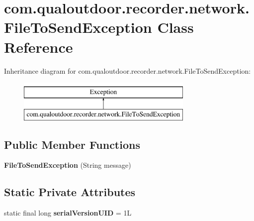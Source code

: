 \hypertarget{classcom_1_1qualoutdoor_1_1recorder_1_1network_1_1FileToSendException}{\section{com.\-qualoutdoor.\-recorder.\-network.\-File\-To\-Send\-Exception Class Reference}
\label{classcom_1_1qualoutdoor_1_1recorder_1_1network_1_1FileToSendException}
}
Inheritance diagram for com.\-qualoutdoor.\-recorder.\-network.\-File\-To\-Send\-Exception\-:\begin{figure}[H]
\begin{center}
\leavevmode
\includegraphics[height=2.000000cm]{classcom_1_1qualoutdoor_1_1recorder_1_1network_1_1FileToSendException}
\end{center}
\end{figure}
\subsection*{Public Member Functions}
\begin{DoxyCompactItemize}
\item 
\hypertarget{classcom_1_1qualoutdoor_1_1recorder_1_1network_1_1FileToSendException_abd17a9fb960efd71bbf6bcfced3400b3}{{\bfseries File\-To\-Send\-Exception} (String message)}\label{classcom_1_1qualoutdoor_1_1recorder_1_1network_1_1FileToSendException_abd17a9fb960efd71bbf6bcfced3400b3}

\end{DoxyCompactItemize}
\subsection*{Static Private Attributes}
\begin{DoxyCompactItemize}
\item 
\hypertarget{classcom_1_1qualoutdoor_1_1recorder_1_1network_1_1FileToSendException_aa6e0078f8a8e9ec1065a9f36a3a662f9}{static final long {\bfseries serial\-Version\-U\-I\-D} = 1\-L}\label{classcom_1_1qualoutdoor_1_1recorder_1_1network_1_1FileToSendException_aa6e0078f8a8e9ec1065a9f36a3a662f9}

\end{DoxyCompactItemize}


